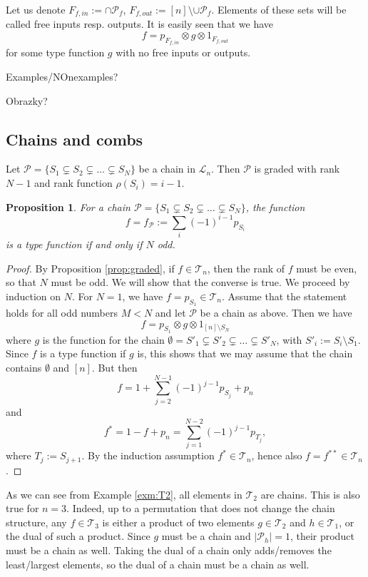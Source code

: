 \documentclass[12pt]{article}
\newtheorem{prop}{Proposition}
\theoremstyle{definition}
\theoremstyle{remark}
\def\Te{\mathcal T}
\def\Pe{\mathcal P}
\begin{document}
Let us denote $F_{f,in}:= \cap\Pe_f$, $F_{f,out}:=[n]\setminus\cup{\Pe_f}$.
Elements of these sets will be called free inputs resp. outputs. It is easily seen that we
have
\[
f=p_{F_{f,in}}\otimes g \otimes 1_{F_{f,out}}
\]
for some type function $g$ with no free inputs or outputs.


Examples/NOnexamples?

Obrazky?



\subsection{Chains and combs}

 Let $\Pe=\{S_1\subsetneq S_2\subsetneq \dots \subsetneq
S_N\}$ be a chain in $\mathcal L_n$. Then  $\Pe$ is graded with rank $N-1$
and rank function $\rho(S_i)=i-1$. 

\begin{prop}\label{prop:chains} For a chain   $\Pe=\{S_1\subsetneq S_2\subsetneq \dots \subsetneq
S_N\}$, the function  
\[
f=f_\Pe:=\sum_i (-1)^{i-1} p_{S_i}
\]
is a type function if and only if $N$ odd.

\end{prop}

\begin{proof}
By Proposition \ref{prop:graded}, if $f\in \Te_n$, then the rank of $f$ must be even, so
that $N$ must be odd. 
We will show that the converse is true. We proceed by induction on $N$. For $N=1$, we have
$f=p_{S_1}\in \Te_n$. Assume that the statement holds for all odd numbers $M<N$ and let
$\Pe$ be a chain as above. Then we have 
\[
f=p_{S_1}\otimes g\otimes 1_{[n]\setminus S_N}
\]
where $g$ is the function for the chain $\emptyset=S'_1\subsetneq S'_2\subsetneq \dots
\subsetneq S'_N$, with $S'_i:=S_i\setminus S_1$. Since $f$ is a type function if $g$ is, this shows that we may assume that 
the chain contains $\emptyset$ and $[n]$.  But then 
\[
f=1+\sum_{j=2}^{N-1} (-1)^{j-1}p_{S_j}+ p_n 
\]
and
\[
f^*=1-f+p_n=\sum_{j=1}^{N-2} (-1)^{j-1}p_{T_j},
\]
where $T_j:=S_{j+1}$. By the induction assumption $f^*\in \Te_n$, hence also $f=f^{**}\in
\Te_n$.
\end{proof}


As we can see from Example \ref{exm:T2}, all elements in $\Te_2$ are chains. This is
also true for $n=3$. Indeed, up to a permutation that does not change the chain structure, 
any $f\in \Te_3$ is either a product of two elements $g\in \Te_2$ and $h\in \Te_1$,
or the dual of such a  product. Since $g$ must be a chain and $|\Pe_h|=1$, their product
must be a chain as well. Taking the dual of a chain only adds/removes the least/largest
elements, so the dual of a chain must be a chain as well.
\end{document}
